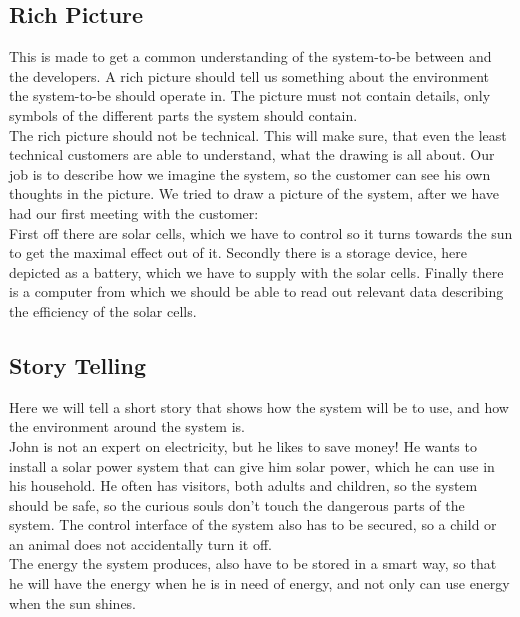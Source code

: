 \documentclass[12pt,a4paper]{report}
\begin{document}
\subsection{Rich Picture}
This is made to get a common understanding of the system-to-be between and the developers. A rich picture should tell us something about the environment the system-to-be should operate in. The picture must not contain details, only symbols of the different parts the system should contain.\\

The rich picture should not be technical. This will make sure, that even the least technical customers are able to understand, what the drawing is all about. Our job is to describe how we imagine the system, so the customer can see his own thoughts in the picture. We tried to draw a picture of the system, after we have had our first meeting with the customer:\\

First off there are solar cells, which we have to control so it turns towards the sun to get the maximal effect out of it. Secondly there is a storage device, here depicted as a battery, which we have to supply with the solar cells. Finally there is a computer from which we should be able to read out relevant data describing the efficiency of the solar cells.\\

\subsection{Story Telling}
Here we will tell a short story that shows how the system will be to use, and how the environment around the system is.\\

John is not an expert on electricity, but he likes to save money! He wants to install a solar power system that can give him solar power, which he can use in his household. He often has visitors, both adults and children, so the system should be safe, so the curious souls don’t touch the dangerous parts of the system. The control interface of the system also has to be secured, so a child or an animal does not accidentally turn it off.\\

The energy the system produces, also have to be stored in a smart way, so that he will have the energy when he is in need of energy, and not only can use energy when the sun shines.\\
\end{document}
